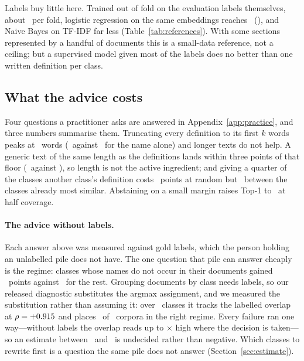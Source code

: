 \documentclass[11pt]{article}
\begin{document}
Labels buy little here. Trained out of fold on the evaluation labels
themselves, about \RefTrainLabels\ per fold, logistic regression on the same
embeddings reaches \RefLRTopOne\ (\RefLRPStat), and Naive Bayes on TF-IDF far
less (Table~\ref{tab:references}). With some sections represented by a handful of documents this is
a small-data reference, not a ceiling; but a supervised model given most of the
labels does no better than one written definition per class.

\subsection{What the advice costs}
\label{sec:practice}

Four questions a practitioner asks are answered in
Appendix~\ref{app:practice}, and three numbers summarise them. Truncating every
definition to its first $k$ words peaks at \DoseBestWords\ words
(\DoseBestTopOne\ against \DoseNameOnly\ for the name alone) and longer texts
do not help. A generic text of the same length as the definitions lands within
three points of that floor (\NoiseGeneric\ against \NoiseFloor), so length is
not the active ingredient; and giving a quarter of the classes another class's
definition costs \NoiseRandomQuarter~points at random but
\NoiseNeighbourQuarter\ between the classes already most similar. Abstaining on
a small margin raises Top-1 to \AbstainHalfTopOne\ at half coverage.

\paragraph{The advice without labels.}
Each answer above was measured against gold labels, which the person holding an
unlabelled pile does not have. The one question that pile can answer cheaply is
the regime: classes whose names do not occur in their documents gained
\GapBelowGain~points against \GapAboveGain\ for the rest. Grouping documents
by class needs labels, so our released diagnostic substitutes the argmax
assignment, and we measured the substitution rather than assuming it: over
\OverlapClasses\ classes it tracks the labelled overlap at
$\rho = +0.915$ and places \OverlapCorporaAgreeing\ of
\OverlapCorpora\ corpora in the right regime. Every failure ran one
way---without labels the overlap reads up to \OverlapWorstInflation$\times$
high where the decision is taken---so an estimate between \OverlapThreshold\
and \OverlapUndecidedUpper\ is undecided rather than negative. Which classes
to rewrite first is a question the same pile does not answer
(Section~\ref{sec:estimate}).
\end{document}
